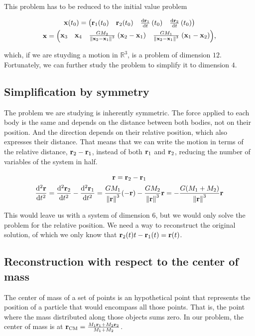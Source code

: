 \documentclass[12pt, onside]{article}
\newcommand{\R}{{\mathbb{R}}}
\newcommand{\vr}{{\vb{r}}}
\newcommand{\vx}{{\vb{x}}}
\newcommand{\CM}{{\operatorname{CM}}}
\begin{document}
    This problem has to be reduced to the initial value problem

\begin{gather*}
    \vx(t_0) = \mqty(
        \vr_1(t_0) &
        \vr_2(t_0) &
        \dv{\vr_1}{t}\, (t_0) &
        \dv{\vr_2}{t}\, (t_0)
    ) \\
    \vx = \mqty(
        \vx_3 &
        \vx_4 &
        \frac{GM_2}{\norm{\vx_2-\vx_1}^3} \; (\vx_2-\vx_1) &
        \frac{GM_1}{\norm{\vx_2-\vx_1}^3} \; (\vx_1-\vx_2)
    ),
\end{gather*}

\noindent
which, if we are stuyding a motion in $\R^3$, is a problem of dimension $12$.
Fortunately, we can further study the problem to simplify it to dimension $4$.

\subsection{Simplification by symmetry}

    The problem we are studying is inherently symmetric.
The force applied to each body is the same and depends on the distance between both bodies,
not on their position.
And the direction depends on their relative position,
which also expresses their distance.
That means that we can write the motion in terms of the relative distance, $\vr_2-\vr_1$,
instead of both $\vr_1$ and $\vr_2$,
reducing the number of variables of the system in half.

\begin{gather*}
    \vr = \vr_2-\vr_1 \\
    \dv[2]{\vr}{t} =
    \dv[2]{\vr_2}{t} - \dv[2]{\vr_1}{t} =
    \frac{GM_1}{\norm{\vr}^3}(-\vr) - \frac{GM_2}{\norm{\vr}^3}\vr =
    - \frac{G(M_1+M_2)}{\norm{\vr}^3}\vr
\end{gather*}

    This would leave us with a system of dimension $6$,
but we would only solve the problem for the relative position.
We need a way to reconstruct the original solution,
of which we only know that $\vr_2(t)t-\vr_1(t) = \vr(t)$.

\subsection{Reconstruction with respect to the center of mass}

    The center of mass of a set of points is an hypothetical point
that represents the position of a particle that would encompass all those points.
That is, the point where the mass distributed along those objects sums zero.
In our problem, the center of mass is at $\vr_{\CM} = \frac{M_1\vr_1 + M_2\vr_2}{M_1+M_2}$.
\end{document}
